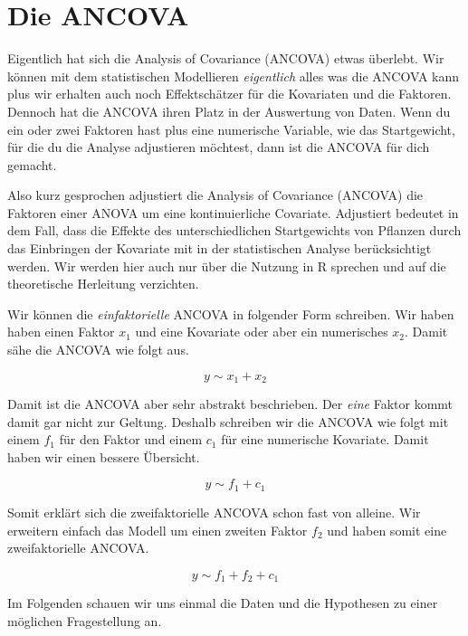 \documentclass[
  letterpaper,
]{scrbook}
\begin{document}
\hypertarget{sec-ancova}{%
\chapter{Die ANCOVA}\label{sec-ancova}}

{}

Eigentlich hat sich die Analysis of Covariance (ANCOVA) etwas überlebt.
Wir können mit dem statistischen Modellieren \emph{eigentlich} alles was
die ANCOVA kann plus wir erhalten auch noch Effektschätzer für die
Kovariaten und die Faktoren. Dennoch hat die ANCOVA ihren Platz in der
Auswertung von Daten. Wenn du ein oder zwei Faktoren hast plus eine
numerische Variable, wie das Startgewicht, für die du die Analyse
adjustieren möchtest, dann ist die ANCOVA für dich gemacht.

Also kurz gesprochen adjustiert die Analysis of Covariance (ANCOVA) die
Faktoren einer ANOVA um eine kontinuierliche Covariate. Adjustiert
bedeutet in dem Fall, dass die Effekte des unterschiedlichen
Startgewichts von Pflanzen durch das Einbringen der Kovariate mit in der
statistischen Analyse berücksichtigt werden. Wir werden hier auch nur
über die Nutzung in R sprechen und auf die theoretische Herleitung
verzichten.

Wir können die \emph{einfaktorielle} ANCOVA in folgender Form schreiben.
Wir haben haben einen Faktor \(x_1\) und eine Kovariate oder aber ein
numerisches \(x_2\). Damit sähe die ANCOVA wie folgt aus.

\[
y \sim x_1 + x_2
\]

Damit ist die ANCOVA aber sehr abstrakt beschrieben. Der \emph{eine}
Faktor kommt damit gar nicht zur Geltung. Deshalb schreiben wir die
ANCOVA wie folgt mit einem \(f_1\) für den Faktor und einem \(c_1\) für
eine numerische Kovariate. Damit haben wir einen bessere Übersicht.

\[
y \sim f_1 + c_1
\]

Somit erklärt sich die zweifaktorielle ANCOVA schon fast von alleine.
Wir erweitern einfach das Modell um einen zweiten Faktor \(f_2\) und
haben somit eine zweifaktorielle ANCOVA.

\[
y \sim f_1 + f_2 + c_1
\]

Im Folgenden schauen wir uns einmal die Daten und die Hypothesen zu
einer möglichen Fragestellung an.
\end{document}
